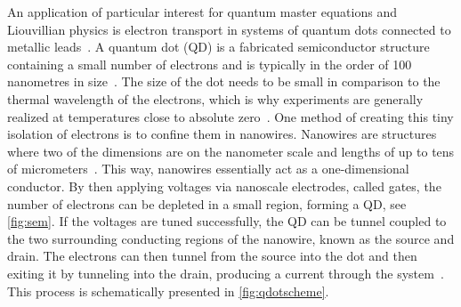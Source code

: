 \documentclass[../main.tex]{subfiles}
\begin{document}
An application of particular interest for quantum master equations and Liouvillian physics is electron transport in systems of quantum dots connected to metallic leads~\cite{qdottrans}. A quantum dot (QD) is a fabricated semiconductor structure containing a small number of electrons and is typically in the order of 100 nanometres in size~\cite{qdotmarcus}. The size of the dot needs to be small in comparison to the thermal wavelength of the electrons, which is why experiments are generally realized at temperatures close to absolute zero~\cite{etrans}. One method of creating this tiny isolation of electrons is to confine them in nanowires. Nanowires are structures where two of the dimensions are on the nanometer scale and lengths of up to tens of micrometers~\cite{sven}. This way, nanowires essentially act as a one-dimensional conductor. By then applying voltages via nanoscale electrodes, called gates, the number of electrons can be depleted in a small region, forming a QD, see \cref{fig:sem}. If the voltages are tuned successfully, the QD can be tunnel coupled to the two surrounding conducting regions of the nanowire, known as the source and drain. The electrons can then tunnel from the source into the dot and then exiting it by tunneling into the drain, producing a current through the system~\cite{qdotmarcus}. This process is schematically presented in \cref{fig:qdotscheme}.
\end{document}
